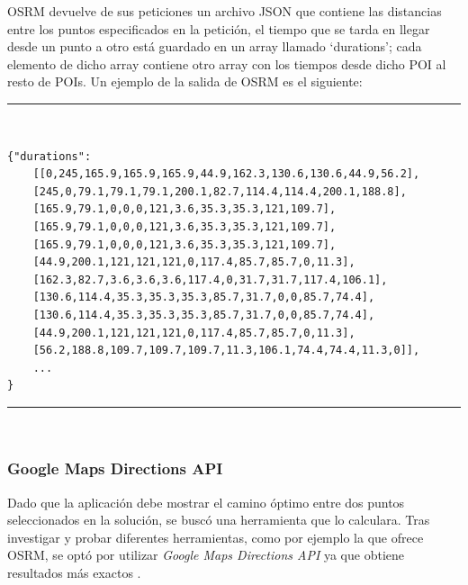 OSRM devuelve de sus peticiones un archivo JSON que contiene las distancias entre los puntos especificados en la petición, el tiempo que se tarda en llegar desde un punto a otro está guardado en un array llamado \enquote*{durations}; cada elemento de dicho array contiene otro array con los tiempos desde dicho POI al resto de POIs. Un ejemplo de la salida de OSRM es el siguiente:\newline
\noindent\rule[-1ex]{\textwidth}{1pt}\\
\begin{lstlisting}[caption=Salida de OSRM.]
{"durations":
	[[0,245,165.9,165.9,165.9,44.9,162.3,130.6,130.6,44.9,56.2],
	[245,0,79.1,79.1,79.1,200.1,82.7,114.4,114.4,200.1,188.8],
	[165.9,79.1,0,0,0,121,3.6,35.3,35.3,121,109.7],
	[165.9,79.1,0,0,0,121,3.6,35.3,35.3,121,109.7],
	[165.9,79.1,0,0,0,121,3.6,35.3,35.3,121,109.7],
	[44.9,200.1,121,121,121,0,117.4,85.7,85.7,0,11.3],
	[162.3,82.7,3.6,3.6,3.6,117.4,0,31.7,31.7,117.4,106.1],
	[130.6,114.4,35.3,35.3,35.3,85.7,31.7,0,0,85.7,74.4],
	[130.6,114.4,35.3,35.3,35.3,85.7,31.7,0,0,85.7,74.4],
	[44.9,200.1,121,121,121,0,117.4,85.7,85.7,0,11.3],
	[56.2,188.8,109.7,109.7,109.7,11.3,106.1,74.4,74.4,11.3,0]],
	...
}
\end{lstlisting}
\noindent\rule[-1ex]{\textwidth}{1pt}\\
\subsubsection[Google Routes API]{Google Maps Directions API}
Dado que la aplicación debe mostrar el camino óptimo entre dos puntos seleccionados en la solución, se buscó una herramienta que lo calculara. Tras investigar y probar diferentes herramientas, como por ejemplo la que ofrece OSRM, se optó por utilizar \textit{Google Maps Directions API} ya que obtiene resultados más exactos \cite{directions_api}.\newline


